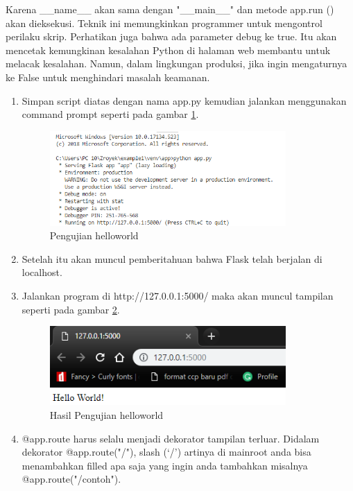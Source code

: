 Karena \_\_name\_\_ akan sama dengan "\_\_main\_\_" dan metode app.run () akan dieksekusi. Teknik ini memungkinkan programmer untuk mengontrol perilaku skrip. Perhatikan juga bahwa ada parameter debug ke true. Itu akan mencetak kemungkinan kesalahan Python di halaman web membantu untuk melacak kesalahan. Namun, dalam lingkungan produksi, jika ingin mengaturnya ke False untuk menghindari masalah keamanan.
\begin{enumerate}
\item Simpan script diatas dengan nama app.py kemudian jalankan menggunakan command prompt seperti pada gambar \ref{fig:phw}.
\begin{figure}[!htbp]
	\centerline{\includegraphics[width=0.85\textwidth]{figures/9/phw.PNG}}
	\caption{Pengujian helloworld}
	\label{fig:phw}
\end{figure}

\item Setelah itu akan muncul pemberitahuan bahwa Flask telah berjalan di localhost.
\item Jalankan program di http://127.0.0.1:5000/ maka akan muncul tampilan seperti pada gambar \ref{fig:hphw}.
\begin{figure}[!htbp]
	\centerline{\includegraphics[width=0.85\textwidth]{figures/9/hphw.PNG}}
	\caption{Hasil Pengujian helloworld}
	\label{fig:hphw}
\end{figure}

\item @app.route harus selalu menjadi dekorator tampilan terluar. Didalam dekorator @app.route("/"), slash (‘/’) artinya di mainroot anda bisa menambahkan filled apa saja yang ingin anda tambahkan misalnya @app.route("/contoh"). 
\end{enumerate}

